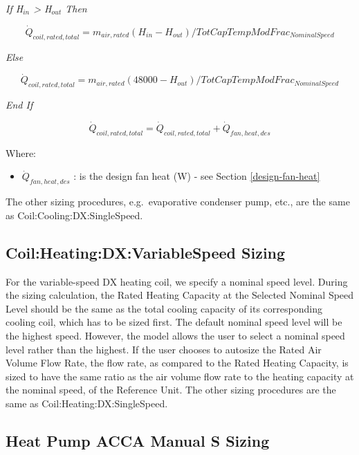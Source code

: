 \emph{If H\(_{in}\) \textgreater{} H\(_{out}\) Then}

\begin{equation}
{\dot{Q}_{coil,rated,total}} = {m_{air,rated}}({H_{in}} - {H_{out}})/TotCapTempModFra{c_{NominalSpeed}}
\end{equation}

\emph{Else}

\begin{equation}
{\dot{Q}_{coil,rated,total}} = {m_{air,rated}}(48000 - {H_{out}})/TotCapTempModFra{c_{NominalSpeed}}
\end{equation}

\emph{End If}

\begin{equation}
{\dot{Q}_{coil,rated,total}} = {\dot{Q}_{coil,rated,total}} + \dot{Q}_{fan,heat,des}
\end{equation}

Where:

\begin{itemize}
\item
  \(\dot{Q}_{fan,heat,des}\) : is the design fan heat (W) - see Section \ref{design-fan-heat}
\end{itemize}


The other sizing procedures, e.g.~evaporative condenser pump, etc., are the same as Coil:Cooling:DX:SingleSpeed.

\subsection{Coil:Heating:DX:VariableSpeed Sizing}\label{coilheatingdxvariablespeed-sizing}

For the variable-speed DX heating coil, we specify a nominal speed level. During the sizing calculation, the Rated Heating Capacity at the Selected Nominal Speed Level should be the same as the total cooling capacity of its corresponding cooling coil, which has to be sized first. The default nominal speed level will be the highest speed. However, the model allows the user to select a nominal speed level rather than the highest. If the user chooses to autosize the Rated Air Volume Flow Rate, the flow rate, as compared to the Rated Heating Capacity, is sized to have the same ratio as the air volume flow rate to the heating capacity at the nominal speed, of the Reference Unit. The other sizing procedures are the same as Coil:Heating:DX:SingleSpeed.

\subsection{Heat Pump ACCA Manual S Sizing}\label{heat-pump-acca-manual-s-sizing}


